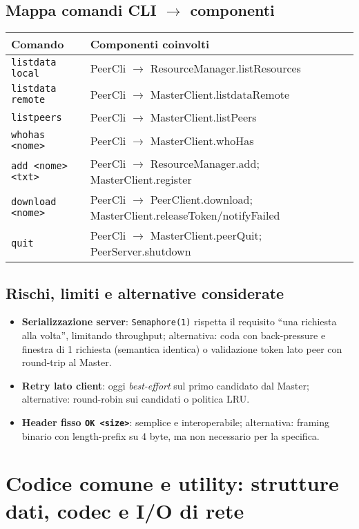 \documentclass[a4paper,12pt]{article}
\begin{document}
\subsection*{Mappa comandi CLI \texorpdfstring{$\rightarrow$}{->} componenti}
\begin{tabular}{@{}p{4.6cm}p{9.6cm}@{}}
\toprule
Comando & Componenti coinvolti \\
\midrule
\texttt{listdata local}   & PeerCli $\rightarrow$ ResourceManager.listResources \\
\texttt{listdata remote}  & PeerCli $\rightarrow$ MasterClient.listdataRemote \\
\texttt{listpeers}        & PeerCli $\rightarrow$ MasterClient.listPeers \\
\texttt{whohas <nome>}    & PeerCli $\rightarrow$ MasterClient.whoHas \\
\texttt{add <nome> <txt>} & PeerCli $\rightarrow$ ResourceManager.add; MasterClient.register \\
\texttt{download <nome>}  & PeerCli $\rightarrow$ PeerClient.download; MasterClient.releaseToken/notifyFailed \\
\texttt{quit}             & PeerCli $\rightarrow$ MasterClient.peerQuit; PeerServer.shutdown \\
\bottomrule
\end{tabular}

\subsection*{Rischi, limiti e alternative considerate}
\begin{itemize}[nosep]
  \item \textbf{Serializzazione server}: \texttt{Semaphore(1)} rispetta il requisito “una richiesta alla volta”, limitando throughput; alternativa: coda con back-pressure e finestra di 1 richiesta (semantica identica) o validazione token lato peer con round-trip al Master.
  \item \textbf{Retry lato client}: oggi \emph{best-effort} sul primo candidato dal Master; alternative: round-robin sui candidati o politica LRU.
  \item \textbf{Header fisso \texttt{OK <size>}}: semplice e interoperabile; alternativa: framing binario con length-prefix su 4 byte, ma non necessario per la specifica.
\end{itemize}


\section{Codice comune e utility: strutture dati, codec e I/O di rete}
\end{document}

